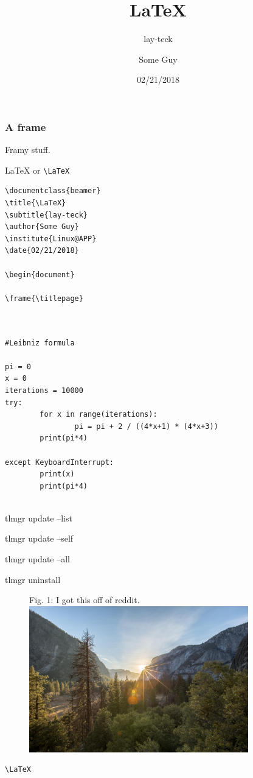 \documentclass{beamer}
\title{\LaTeX}
\subtitle{lay-teck}
\author{Some Guy}
\institute{Linux@APP}
\date{02/21/2018}
\begin{document}
\frame{\titlepage}

\begin{frame}[fragile]
\frametitle{A frame}
Framy stuff.

{\LaTeX} or \verb|\LaTeX|
\begin{verbatim}
\documentclass{beamer}
\title{\LaTeX}
\subtitle{lay-teck}
\author{Some Guy}
\institute{Linux@APP}
\date{02/21/2018}

\begin{document}

\frame{\titlepage}


\end{verbatim}


\end{frame}

\begin{frame}[fragile]

\begin{verbatim}

#Leibniz formula

pi = 0
x = 0
iterations = 10000
try:
        for x in range(iterations):
                pi = pi + 2 / ((4*x+1) * (4*x+3))
        print(pi*4)

except KeyboardInterrupt:
        print(x)
        print(pi*4)


\end{verbatim}

\end{frame}

\begin{frame}
tlmgr update --list

tlmgr update --self

tlmgr update --all

tlmgr uninstall
\begin{figure}{Fig. 1: I got this off of reddit.}
\centering
\includegraphics[height=2.5in]{picture1}
\end{figure}
\end{frame}

\begin{frame}[fragile]

\end{frame}

\begin{frame}[fragile]
\begin{verbatim}
\LaTeX
\end{verbatim}
\end{frame}
\end{document}
